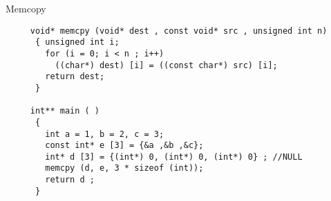 \begin{frame}[fragile]{Memcopy}
     \lstset{basicstyle=\tiny, stepnumber=10000, language=C}
     \begin{lstlisting} 
     void* memcpy (void* dest , const void* src , unsigned int n) 
      { unsigned int i; 
        for (i = 0; i < n ; i++)
          ((char*) dest) [i] = ((const char*) src) [i]; 
        return dest;
      }

     int** main ( ) 
      {
        int a = 1, b = 2, c = 3;
        const int* e [3] = {&a ,&b ,&c};
        int* d [3] = {(int*) 0, (int*) 0, (int*) 0} ; //NULL
        memcpy (d, e, 3 * sizeof (int));
        return d ;
      }
     \end{lstlisting}
\end{frame}


